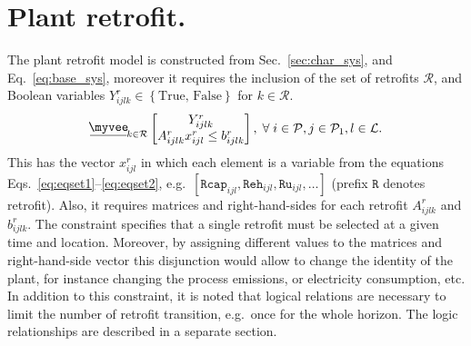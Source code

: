 \documentclass{amsbook}
\newcommand{\myveebar}{\mathbin{\vcenter{\hbox{$ \underline{\mkern-2.4mu{\myvee}\mkern-2.4mu} $}}}}
\begin{document}
\section{Plant retrofit.}\label{sec:rf}
%
The plant retrofit model is constructed from Sec.~\ref{sec:char_sys}, and
Eq.~\eqref{eq:base_sys}, moreover it requires the inclusion of the set of
retrofits $\mathcal{R}$, and Boolean variables $Y^r_{ijlk} \in
\left\{\text{True, False}\right\}$ for $k\in \mathcal{R}$.
%
\begin{equation}\label{eq:rf}
    \myveebar_{k \in \mathcal{R}}
    \begin{bmatrix}
        Y^r_{ijlk} \\
        A^r_{ijlk} x^r_{ijl} \leq b^r_{ijlk}
    \end{bmatrix},
    \; \forall \; i \in \mathcal{P},j \in \mathcal{P}_1 ,
    l \in \mathcal{L}.
\end{equation}
%
This has the vector $x^r_{ijl}$ in which each element is a variable from the
equations Eqs.~\eqref{eq:eqset1}--\eqref{eq:eqset2}, e.g.\
$\left[\mathtt{Rcap}_{ijl}, \mathtt{Reh}_{ijl}, \mathtt{Ru}_{ijl}, \dots
\right]$ (prefix $\mathtt{R}$ denotes retrofit). Also, it requires matrices and
right-hand-sides for each retrofit $A^r_{ijlk}$ and $b^r_{ijlk}$. 
The constraint specifies that a single retrofit must be selected at a given time
and location.
Moreover, by assigning different values to the matrices and right-hand-side
vector this disjunction would allow to change the identity of the plant, for
instance changing the process emissions, or electricity consumption, etc. 
In addition to this constraint, it is noted that logical relations are necessary
to limit the number of retrofit transition, e.g.\ once for the whole horizon.
The logic relationships are described in a separate section. 
%
\end{document}
